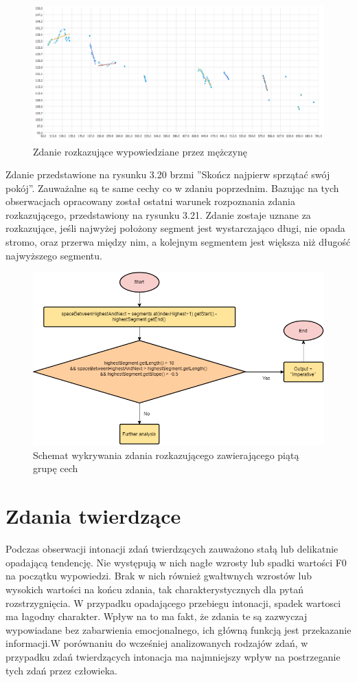 \documentclass[a4paper,12 pt]{report}
\begin{document}
 \FloatBarrier
\begin{figure}[h]
\centering
\includegraphics[scale=0.85]{rozkaz_6.pdf}
\caption{Zdanie rozkazujące wypowiedziane przez mężczynę}
\end{figure}
\FloatBarrier
Zdanie przedstawione na rysunku 3.20 brzmi ''Skończ najpierw sprzątać swój pokój''. Zauważalne są te same cechy co w zdaniu poprzednim. Bazując na tych obserwacjach opracowany został ostatni warunek rozpoznania zdania rozkazującego, przedstawiony na rysunku 3.21. Zdanie zostaje uznane za rozkazujące, jeśli najwyżej położony segment jest wystarczająco długi, nie opada stromo, oraz przerwa między nim, a kolejnym segmentem jest większa niż długość najwyższego segmentu.
 \FloatBarrier
\begin{figure}[h]
\centering
\includegraphics[scale=0.9]{Imperative5.png}
\caption{Schemat wykrywania zdania rozkazującego zawierającego piątą grupę cech}
\end{figure}
\FloatBarrier

\section{Zdania twierdzące}
Podczas obserwacji intonacji zdań twierdzących zauważono stałą lub delikatnie opadającą tendencję. Nie występują w nich nagłe wzrosty lub spadki wartości F0 na początku wypowiedzi. Brak w nich również gwałtwnych wzrostów lub wysokich wartości na końcu zdania, tak charakterystycznych dla pytań rozstrzygnięcia.
W przypadku opadającego przebiegu intonacji, spadek wartosci ma łagodny charakter. Wpływ na to ma fakt, że zdania te są zazwyczaj wypowiadane bez zabarwienia emocjonalnego, ich główną funkcją jest przekazanie informacji.W porównaniu do wcześniej analizowanych rodzajów zdań, w przypadku zdań twierdzących intonacja ma najmniejszy wpływ na postrzeganie tych zdań przez człowieka.
\end{document}

